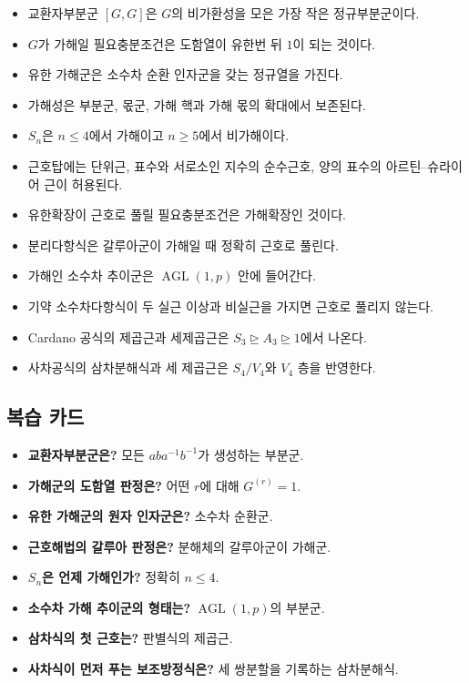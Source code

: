 \begin{chapterreview}
\begin{itemize}
  \item 교환자부분군 $[G,G]$은 $G$의 비가환성을 모은 가장 작은 정규부분군이다.
  \item $G$가 가해일 필요충분조건은 도함열이 유한번 뒤 $1$이 되는 것이다.
  \item 유한 가해군은 소수차 순환 인자군을 갖는 정규열을 가진다.
  \item 가해성은 부분군, 몫군, 가해 핵과 가해 몫의 확대에서 보존된다.
  \item $S_n$은 $n\le4$에서 가해이고 $n\ge5$에서 비가해이다.
  \item 근호탑에는 단위근, 표수와 서로소인 지수의 순수근호, 양의 표수의 아르틴--슈라이어 근이 허용된다.
  \item 유한확장이 근호로 풀릴 필요충분조건은 가해확장인 것이다.
  \item 분리다항식은 갈루아군이 가해일 때 정확히 근호로 풀린다.
  \item 가해인 소수차 추이군은 $\operatorname{AGL}(1,p)$ 안에 들어간다.
  \item 기약 소수차다항식이 두 실근 이상과 비실근을 가지면 근호로 풀리지 않는다.
  \item Cardano 공식의 제곱근과 세제곱근은 $S_3\trianglerighteq A_3\trianglerighteq1$에서 나온다.
  \item 사차공식의 삼차분해식과 세 제곱근은 $S_4/V_4$와 $V_4$ 층을 반영한다.
\end{itemize}
\end{chapterreview}

\subsection*{복습 카드}

\begin{itemize}
  \item \textbf{교환자부분군은?} 모든 $aba^{-1}b^{-1}$가 생성하는 부분군.
  \item \textbf{가해군의 도함열 판정은?} 어떤 $r$에 대해 $G^{(r)}=1$.
  \item \textbf{유한 가해군의 원자 인자군은?} 소수차 순환군.
  \item \textbf{근호해법의 갈루아 판정은?} 분해체의 갈루아군이 가해군.
  \item \textbf{$S_n$은 언제 가해인가?} 정확히 $n\le4$.
  \item \textbf{소수차 가해 추이군의 형태는?} $\operatorname{AGL}(1,p)$의 부분군.
  \item \textbf{삼차식의 첫 근호는?} 판별식의 제곱근.
  \item \textbf{사차식이 먼저 푸는 보조방정식은?} 세 쌍분할을 기록하는 삼차분해식.
\end{itemize}
